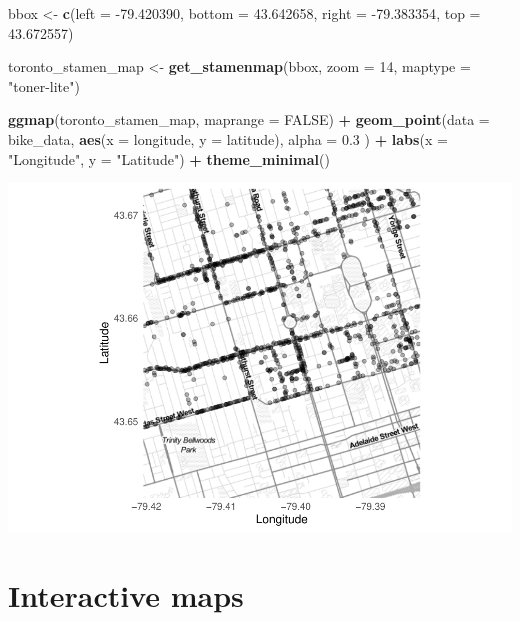 \documentclass[
]{book}
\newenvironment{Shaded}{\begin{snugshade}}{\end{snugshade}}
\newcommand{\DataTypeTok}[1]{\textcolor[rgb]{0.13,0.29,0.53}{#1}}
\newcommand{\DecValTok}[1]{\textcolor[rgb]{0.00,0.00,0.81}{#1}}
\newcommand{\FloatTok}[1]{\textcolor[rgb]{0.00,0.00,0.81}{#1}}
\newcommand{\KeywordTok}[1]{\textcolor[rgb]{0.13,0.29,0.53}{\textbf{#1}}}
\newcommand{\NormalTok}[1]{#1}
\newcommand{\OperatorTok}[1]{\textcolor[rgb]{0.81,0.36,0.00}{\textbf{#1}}}
\newcommand{\OtherTok}[1]{\textcolor[rgb]{0.56,0.35,0.01}{#1}}
\newcommand{\StringTok}[1]{\textcolor[rgb]{0.31,0.60,0.02}{#1}}
\begin{document}
\begin{Shaded}
\begin{Highlighting}[]
\NormalTok{bbox <-}\StringTok{ }\KeywordTok{c}\NormalTok{(}\DataTypeTok{left =} \FloatTok{-79.420390}\NormalTok{, }\DataTypeTok{bottom =} \FloatTok{43.642658}\NormalTok{, }\DataTypeTok{right =} \FloatTok{-79.383354}\NormalTok{, }\DataTypeTok{top =} \FloatTok{43.672557}\NormalTok{)}

\NormalTok{toronto_stamen_map <-}\StringTok{ }\KeywordTok{get_stamenmap}\NormalTok{(bbox, }\DataTypeTok{zoom =} \DecValTok{14}\NormalTok{, }\DataTypeTok{maptype =} \StringTok{"toner-lite"}\NormalTok{)}

\KeywordTok{ggmap}\NormalTok{(toronto_stamen_map,  }\DataTypeTok{maprange =} \OtherTok{FALSE}\NormalTok{) }\OperatorTok{+}
\StringTok{  }\KeywordTok{geom_point}\NormalTok{(}\DataTypeTok{data =}\NormalTok{ bike_data,}
             \KeywordTok{aes}\NormalTok{(}\DataTypeTok{x =}\NormalTok{ longitude, }
                 \DataTypeTok{y =}\NormalTok{ latitude),}
             \DataTypeTok{alpha =} \FloatTok{0.3}
\NormalTok{             ) }\OperatorTok{+}
\StringTok{  }\KeywordTok{labs}\NormalTok{(}\DataTypeTok{x =} \StringTok{"Longitude"}\NormalTok{,}
       \DataTypeTok{y =} \StringTok{"Latitude"}\NormalTok{) }\OperatorTok{+}
\StringTok{  }\KeywordTok{theme_minimal}\NormalTok{() }
\end{Highlighting}
\end{Shaded}

\includegraphics{telling_stories_with_data_files/figure-latex/unnamed-chunk-114-1.pdf}

\hypertarget{interactive-maps}{%
\section{Interactive maps}\label{interactive-maps}}
\end{document}
